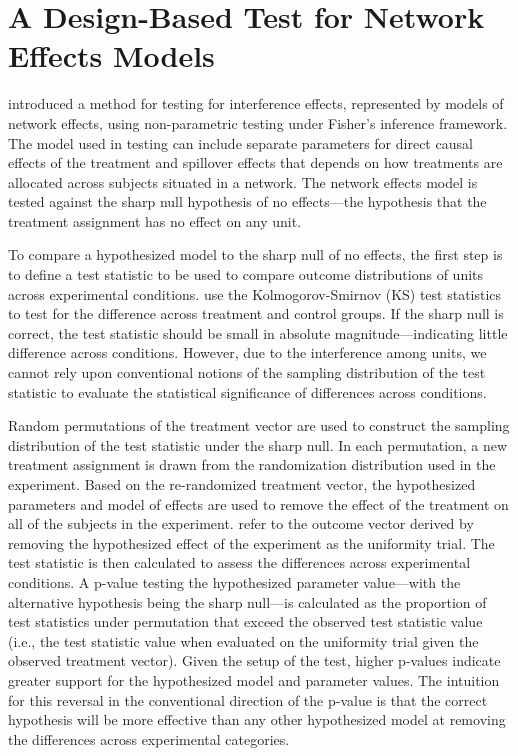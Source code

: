 \documentclass[12pt]{article}
\begin{document}
\section{A Design-Based Test for Network Effects Models}

\citet{bowers2012reasoning} introduced a method for testing for interference effects, represented by models of network effects, using non-parametric testing under Fisher's inference framework. The model used in testing can include separate parameters for direct causal effects of the treatment and spillover effects that depends on how treatments are allocated across subjects situated in a network. The network effects model is tested against the sharp null hypothesis of no effects---the hypothesis that the treatment assignment has no effect on any unit. 

To compare a hypothesized model to the sharp null of no effects, the first step is to define a test statistic to be used to compare outcome distributions of units across experimental conditions. \citet{bowers2012reasoning} use the Kolmogorov-Smirnov (KS) test statistics to test for the difference across treatment and control groups. If the sharp null is correct, the test statistic should be small in absolute magnitude---indicating little difference across conditions. However, due to the interference among units, we cannot rely upon conventional notions of the sampling distribution of the test statistic to evaluate the statistical significance of differences across conditions.  

Random permutations of the treatment vector are used to construct the sampling distribution of the test statistic under the sharp null.  In each permutation, a new treatment assignment is drawn from the randomization distribution used in the experiment. Based on the re-randomized treatment vector, the hypothesized parameters and model of effects are used to remove the effect of the treatment on all of the subjects in the experiment. \citet{bowers2012reasoning} refer to the outcome vector derived by removing the hypothesized effect of the experiment as the uniformity trial. The test statistic is then calculated to assess the differences across experimental conditions. A p-value testing the hypothesized parameter value---with the alternative hypothesis being the sharp null---is calculated as the proportion of test statistics under permutation that exceed the observed test statistic value (i.e., the test statistic value when evaluated on the uniformity trial given the observed treatment vector). Given the setup of the test, higher p-values indicate greater support for the hypothesized model and parameter values. The intuition for this reversal in the conventional direction of the p-value is that the correct hypothesis will be more effective than any other hypothesized model at removing the differences across experimental categories.
\end{document}
